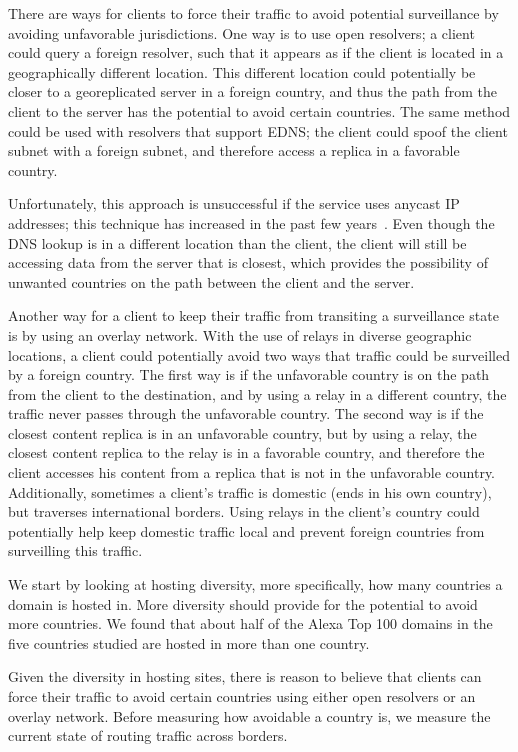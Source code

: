 There are ways for clients to force their traffic to avoid potential
surveillance by avoiding unfavorable jurisdictions.  One way is to use
open resolvers; a client could query a foreign resolver, such that it
appears as if the client is located in a geographically different
location.  This different location could potentially be closer to a
georeplicated server in a foreign country, and thus the path from the
client to the server has the potential to avoid certain countries.  The
same method could be used with resolvers that support EDNS; the client
could spoof the client subnet with a foreign subnet, and therefore
access a replica in a favorable country. 

Unfortunately, this approach is unsuccessful if the service uses anycast
IP addresses; this technique has increased in the past few
years~\cite{cicalese2015characterizing}.  Even though the DNS lookup is
in a different location than the client, the client will still be
accessing data from the server that is closest, which provides the
possibility of unwanted countries on the path between the client and the
server.   

Another way for a client to keep their traffic from transiting a
surveillance state is by using an overlay network.  With the use of
relays in diverse geographic locations, a client could potentially avoid
two ways that traffic could be surveilled by a foreign country.  The
first way is if the unfavorable country is on the path from the client
to the destination, and by using a relay in a different country, the
traffic never passes through the unfavorable country.  The second way is
if the closest content replica is in an unfavorable country, but by
using a relay, the closest content replica to the relay is in a
favorable country, and therefore the client accesses his content from a
replica that is not in the unfavorable country.  Additionally, sometimes
a client's traffic is domestic (ends in his own country), but traverses
international borders.  Using relays in the client's country could
potentially help keep domestic traffic local and prevent foreign
countries from surveilling this traffic. 

We start by looking at hosting diversity, more specifically, how many
countries a domain is hosted in.  More diversity should provide for the
potential to avoid more countries.  We found that about half of the
Alexa Top 100 domains in the five countries studied are hosted in more
than one country. 

Given the diversity in hosting sites, there is reason to believe that
clients can force their traffic to avoid certain countries using either
open resolvers or an overlay network.  Before measuring how avoidable a
country is, we measure the current state of routing traffic across
borders.  


